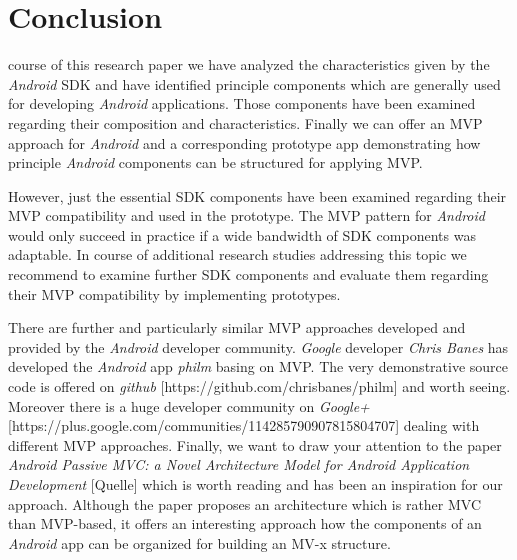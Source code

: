 \section{Conclusion}

 course of this research paper we have analyzed the characteristics given by the \emph{Android} SDK and have identified 
principle components which are generally used for developing \emph{Android} applications. Those components have been examined regarding their composition and characteristics. 
Finally we can offer an MVP approach for \emph{Android} and a corresponding prototype app demonstrating how principle \emph{Android} components can be structured for applying MVP.

However, just the essential SDK components have been examined regarding their MVP compatibility and used in the prototype. 
The MVP pattern for \emph{Android} would only succeed in practice if a wide bandwidth of SDK components was adaptable. 
In course of additional research studies addressing this topic we recommend to examine further SDK components and 
evaluate them regarding their MVP compatibility by implementing prototypes.

There are further and particularly similar MVP approaches developed and provided by the \emph{Android} developer community. 
\emph{Google} developer \emph{Chris Banes} has developed the \emph{Android} app \emph{philm} basing on MVP. 
The very demonstrative source code is offered on \emph{github} [https://github.com/chrisbanes/philm] and worth seeing. 
Moreover there is a huge developer community on \emph{Google+} [https://plus.google.com/communities/114285790907815804707] dealing with different MVP approaches. 
Finally, we want to draw your attention to the paper \emph{Android Passive MVC: a Novel Architecture Model for Android Application Development} 
[Quelle] which is worth reading and has been an inspiration for our approach. Although the paper proposes an architecture which is rather MVC than MVP-based, 
it offers an interesting approach how the components of an \emph{Android} app can be organized for building an MV-x structure. 